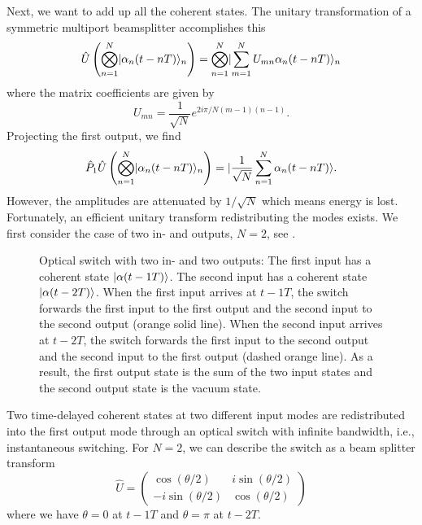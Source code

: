 Next, we want to add up all the coherent states.
The unitary transformation of a symmetric multiport beamsplitter accomplishes this
\begin{equation}
	\hat{U}
	\left(
		\bigotimes_{n=1}^N
		\lvert\alpha_n(t-nT)\rangle_n
	\right)
	=
	\bigotimes_{n=1}^N
	\lvert\sum_{m=1}^NU_{mn}\alpha_n(t-nT)\rangle_n
\end{equation}
where the matrix coefficients are given by~\cite{Zukowski1997}
\begin{equation}
	U_{mn}
	=
	\frac{1}{\sqrt{N}}
	e^{2i\pi/N(m-1)(n-1)}
	.
\end{equation}
Projecting the first output, we find
\begin{equation}
	\hat{P}_1
	\hat{U}
	\left(
		\bigotimes_{n=1}^N
		\lvert\alpha_n(t-nT)\rangle_n
	\right)
	=
	\lvert\frac{1}{\sqrt{N}}\sum_{n=1}^N\alpha_n(t-nT)\rangle
	.
\end{equation}
However, the amplitudes are attenuated by $1/\sqrt{N}$ which means energy is lost.
Fortunately, an efficient unitary transform redistributing the modes exists.
We first consider the case of two in- and outputs, $N=2$, see .
\begin{figure}[htb]
	\centering
	
	\caption{Optical switch with two in- and two outputs: The first input has a coherent state $\lvert\alpha(t-1T)\rangle$. The second input has a coherent state $\lvert\alpha(t-2T)\rangle$. When the first input arrives at $t-1T$, the switch forwards the first input to the first output and the second input to the second output (orange solid line). When the second input arrives at $t-2T$, the switch forwards the first input to the second output and the second input to the first output (dashed orange line). As a result, the first output state is the sum of the two input states and the second output state is the vacuum state.}\label{fig:quantum_switch}
\end{figure}
Two time-delayed coherent states at two different input modes are redistributed into the first output mode through an optical switch with infinite bandwidth, i.e., instantaneous switching.
For $N=2$, we can describe the switch as a beam splitter transform
\begin{equation}
	\hat{U}
	=
	\begin{pmatrix}
		\cos(\theta/2) & i\sin(\theta/2) \\
		-i\sin(\theta/2) & \cos(\theta/2)
	\end{pmatrix}
\end{equation}
where we have $\theta=0$ at $t-1T$ and $\theta=\pi$ at $t-2T$.